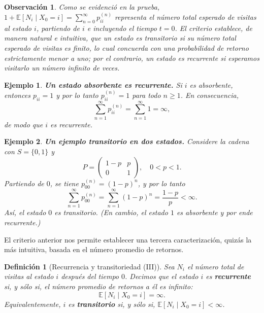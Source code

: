 \documentclass[12pt]{book}
\newtheorem{definition}{Definición}[chapter]
\newtheorem{example}{Ejemplo}[chapter]
\newtheorem{remark}{Observación}[chapter]
\begin{document}
\begin{remark}
Como se evidenció en la prueba, $1 + \mathbb{E}[N_i \mid X_0 = i] = \sum_{n=0}^{\infty} p_{ii}^{(n)}$ representa el número total esperado de visitas al estado $i$, partiendo de $i$ e incluyendo el tiempo $t=0$. El criterio establece, de manera natural e intuitiva, que un estado es transitorio si su número total esperado de visitas es finito, lo cual concuerda con una probabilidad de retorno estrictamente menor a uno; por el contrario, un estado es recurrente si esperamos visitarlo un número infinito de veces.
\end{remark}

\begin{example}
\textbf{Un estado absorbente es recurrente.} Si $i$ es absorbente, entonces $p_{ii}=1$ y por lo tanto $p_{ii}^{(n)}=1$ para todo $n\geq 1$. En consecuencia,
\[
\sum_{n=1}^{\infty} p_{ii}^{(n)} = \sum_{n=1}^{\infty} 1 = \infty,
\]
de modo que $i$ es recurrente.
\end{example}

\begin{example}
\textbf{Un ejemplo transitorio en dos estados.} Considere la cadena con $S=\{0,1\}$ y
\[
P=\begin{pmatrix}
1-p & p \\
0 & 1
\end{pmatrix}, \quad 0<p<1.
\]
Partiendo de $0$, se tiene $p_{00}^{(n)}=(1-p)^n$, y por lo tanto
\[
\sum_{n=1}^{\infty} p_{00}^{(n)} = \sum_{n=1}^{\infty}(1-p)^n = \frac{1-p}{p} < \infty.
\]
Así, el estado $0$ es transitorio. (En cambio, el estado $1$ es absorbente y por ende recurrente.)
\end{example}


El criterio anterior nos permite establecer una tercera caracterización, quizás la más intuitiva, basada en el número promedio de retornos.

\begin{definition}[Recurrencia y transitoriedad (III)]
Sea $N_i$ el número total de visitas al estado $i$ después del tiempo $0$. Decimos que el estado $i$ es \textbf{recurrente} si, y sólo si, el número promedio de retornos a él es infinito:
\[
\mathbb{E}[N_i \mid X_0 = i] = \infty.
\]
Equivalentemente, $i$ es \textbf{transitorio} si, y sólo si, $\mathbb{E}[N_i \mid X_0 = i] < \infty$.
\end{definition}
\end{document}
